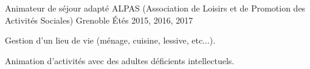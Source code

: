 


\begin{cventries}


\cventry
{Animateur de séjour adapté} %
{ALPAS (Association de Loisirs et de Promotion des Activités Sociales)} %
{Grenoble} %
{Étés 2015, 2016, 2017} %
{ %
\begin{cvitems}
\item {Gestion d'un lieu de vie (ménage, cuisine, lessive, etc...).}
\item {Animation d'activités avec des adultes déficients intellectuels.}
\end{cvitems}
}


\end{cventries}